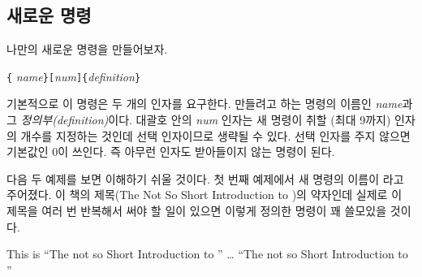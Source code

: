 \subsection{새로운 명령}

나만의 새로운 명령을 만들어보자.
\begin{lscommand}
\verb|{|%
       \emph{name}\verb|}[|\emph{num}\verb|]{|\emph{definition}\verb|}|
\end{lscommand}
\noindent 기본적으로 이 명령은 두 개의 인자를 요구한다.
만들려고 하는 명령의 이름인 \emph{name}과 그 \emph{정의부(definition)}이다.
대괄호 안의 \emph{num} 인자는 새 명령이 취할 (최대 9까지) 인자의 개수를 지정하는
것인데 선택 인자이므로 생략될 수 있다.
선택 인자를 주지 않으면 기본값인 0이 쓰인다. 즉 아무런 인자도 받아들이지 않는 명령이 된다.

다음 두 예제를 보면 이해하기 쉬울 것이다.
첫 번째 예제에서 새 명령의 이름이 라고 주어졌다. 
이 책의 제목(The Not So Short Introduction to \LaTeXe)의 약자인데
실제로 이 제목을 여러 번 반복해서 써야 할 일이 있으면 이렇게 정의한 명령이 꽤 
쓸모있을 것이다.

\begin{example}
\newcommand{\tnss}{The not
    so Short Introduction to
    \LaTeXe}
This is ``\tnss'' \ldots{}
``\tnss''
\end{example}

